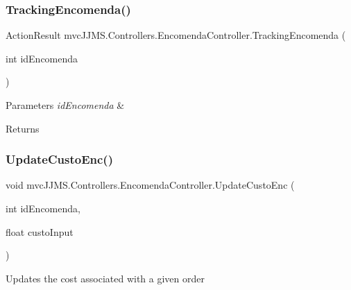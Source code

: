 \subsubsection{\texorpdfstring{Tracking\+Encomenda()}{TrackingEncomenda()}}
{\footnotesize\ttfamily Action\+Result mvc\+J\+J\+M\+S.\+Controllers.\+Encomenda\+Controller.\+Tracking\+Encomenda (\begin{DoxyParamCaption}\item[{int}]{id\+Encomenda }\end{DoxyParamCaption})\hspace{0.3cm}{\ttfamily [inline]}}






\begin{DoxyParams}{Parameters}
{\em id\+Encomenda} & \\
\hline
\end{DoxyParams}
\begin{DoxyReturn}{Returns}

\end{DoxyReturn}
\mbox{\label{classmvc_j_j_m_s_1_1_controllers_1_1_encomenda_controller_a9f2e8359f35f8d5e737c3a1d9ff7b1c1}} 
\subsubsection{\texorpdfstring{Update\+Custo\+Enc()}{UpdateCustoEnc()}}
{\footnotesize\ttfamily void mvc\+J\+J\+M\+S.\+Controllers.\+Encomenda\+Controller.\+Update\+Custo\+Enc (\begin{DoxyParamCaption}\item[{int}]{id\+Encomenda,  }\item[{float}]{custo\+Input }\end{DoxyParamCaption})\hspace{0.3cm}{\ttfamily [inline]}}



Updates the cost associated with a given order 


